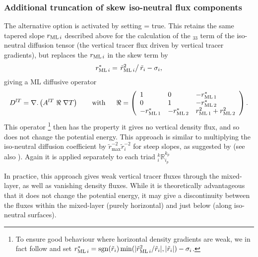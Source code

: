 \documentclass[NEMO_book]{subfiles}
\begin{document}
\subsubsection{Additional truncation of skew iso-neutral flux
  components}
\label{sec:triad:Gerdes-taper}
The alternative option is activated by setting  =
  true. This retains the same tapered slope $r_{\mathrm{ML}\,i}$  described above for the
calculation of the $_{33}$ term of the iso-neutral diffusion tensor (the
vertical tracer flux driven by vertical tracer gradients), but
replaces the $r_{\mathrm{ML}\,i}$ in the skew term by
\begin{equation}
  \label{eq:triad:rm*}
  r_{\mathrm{ML}\,i}^*=\left.\tilde{r}_{\mathrm{ML}\,i}^2\right/\tilde{r}_i-\sigma_i,
\end{equation}
giving a ML diffusive operator
\begin{equation} \label{eq:triad:iso_tensor_ML2}
D^{lT}=\nabla {\rm {\bf .}}\left( {A^{lT}\;\Re \;\nabla T} \right) \qquad
\mbox{with}\quad \;\;\Re =\left( {{\begin{array}{*{20}c}
 1 \hfill & 0 \hfill & {-\rML[1]^*}\hfill \\
 0 \hfill & 1 \hfill & {-\rML[2]^*} \hfill \\
 {-\rML[1]^*}\hfill &   {-\rML[2]^*} \hfill & {\rML[1]^2+\rML[2]^2} \hfill \\
\end{array} }} \right).
\end{equation}
This operator
\footnote{To ensure good behaviour where horizontal density
  gradients are weak, we in fact follow \citet{Gerdes1991} and set
$r_{\mathrm{ML}\,i}^*=\mathrm{sgn}(\tilde{r}_i)\min(|\tilde{r}_{\mathrm{ML}\,i}^2/\tilde{r}_i|,|\tilde{r}_i|)-\sigma_i$.}
then has the property it gives no vertical density flux, and so does
not change the potential energy.
This approach is similar to multiplying the iso-neutral  diffusion
coefficient by $\tilde{r}_\mathrm{max}^{-2}\tilde{r}_i^{-2}$ for steep
slopes, as suggested by \citet{Gerdes1991} (see also \citet{Griffies_Bk04}).
Again it is applied separately to each triad $_i^k\mathbb{R}_{i_p}^{k_p}$

In practice, this approach gives weak vertical tracer fluxes through
the mixed-layer, as well as vanishing density fluxes. While it is
theoretically advantageous that it does not change the potential
energy, it may give a discontinuity between the
fluxes within the mixed-layer (purely horizontal) and just below (along
iso-neutral surfaces).
\end{document}

